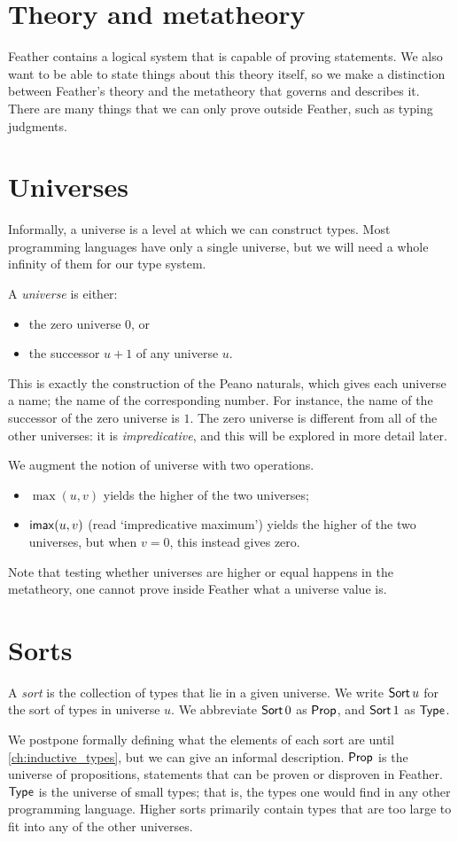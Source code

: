 \section{Theory and metatheory}
Feather contains a logical system that is capable of proving statements.
We also want to be able to state things about this theory itself, so we make a distinction between Feather's theory and the metatheory that governs and describes it.
There are many things that we can only prove outside Feather, such as typing judgments.

\section{Universes}
Informally, a universe is a level at which we can construct types. Most programming languages have only a single universe, but we will need a whole infinity of them for our type system.
\begin{defn}
	A \textit{universe} is either:
	\begin{itemize}
		\item the zero universe \( 0 \), or
		\item the successor \( u + 1 \) of any universe \( u \).
	\end{itemize}
\end{defn}
This is exactly the construction of the Peano naturals, which gives each universe a name; the name of the corresponding number.
For instance, the name of the successor of the zero universe is \( 1 \).
The zero universe is different from all of the other universes: it is \textit{impredicative}, and this will be explored in more detail later.

We augment the notion of universe with two operations.
\begin{itemize}
	\item \( \max(u, v) \) yields the higher of the two universes;
	\item \( \mathsf{imax}(u, v) \) (read `impredicative maximum') yields the higher of the two universes, but when \( v = 0 \), this instead gives zero.
\end{itemize}
Note that testing whether universes are higher or equal happens in the metatheory, one cannot prove inside Feather what a universe value is.

\section{Sorts}
\begin{defn}
	A \textit{sort} is the collection of types that lie in a given universe. We write \( \operatorname{\mathsf{Sort}} u \) for the sort of types in universe \( u \).
	We abbreviate \( \operatorname{\mathsf{Sort}} 0 \) as \( \mathsf{Prop} \), and \( \operatorname{\mathsf{Sort}} 1 \) as \( \mathsf{Type} \).
\end{defn}
We postpone formally defining what the elements of each sort are until \cref{ch:inductive_types}, but we can give an informal description.
\( \mathsf{Prop} \) is the universe of propositions, statements that can be proven or disproven in Feather.
\( \mathsf{Type} \) is the universe of small types; that is, the types one would find in any other programming language.
Higher sorts primarily contain types that are too large to fit into any of the other universes.

